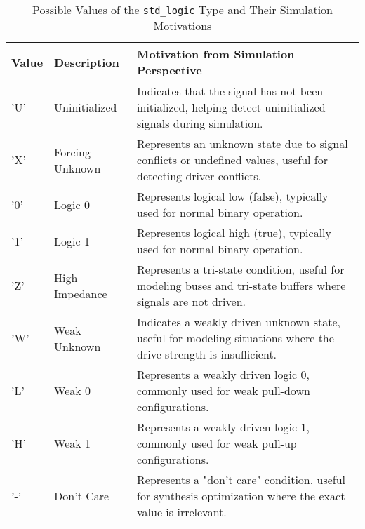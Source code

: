 \documentclass{article}
\begin{document}
\begin{table}[ht]
\centering
\begin{tabular}{|>{\raggedright\arraybackslash}p{1.5cm}|>{\raggedright\arraybackslash}p{3.5cm}|>{\raggedright\arraybackslash}p{7cm}|}
\hline
\textbf{Value} & \textbf{Description} & \textbf{Motivation from Simulation Perspective} \\
\hline
'U' & Uninitialized & Indicates that the signal has not been initialized, helping detect uninitialized signals during simulation. \\
\hline
'X' & Forcing Unknown & Represents an unknown state due to signal conflicts or undefined values, useful for detecting driver conflicts. \\
\hline
'0' & Logic 0 & Represents logical low (false), typically used for normal binary operation. \\
\hline
'1' & Logic 1 & Represents logical high (true), typically used for normal binary operation. \\
\hline
'Z' & High Impedance & Represents a tri-state condition, useful for modeling buses and tri-state buffers where signals are not driven. \\
\hline
'W' & Weak Unknown & Indicates a weakly driven unknown state, useful for modeling situations where the drive strength is insufficient. \\
\hline
'L' & Weak 0 & Represents a weakly driven logic 0, commonly used for weak pull-down configurations. \\
\hline
'H' & Weak 1 & Represents a weakly driven logic 1, commonly used for weak pull-up configurations. \\
\hline
'-' & Don't Care & Represents a "don't care" condition, useful for synthesis optimization where the exact value is irrelevant. \\
\hline
\end{tabular}
\caption{Possible Values of the \texttt{std\_logic} Type and Their Simulation Motivations}
\end{table}
\end{document}
